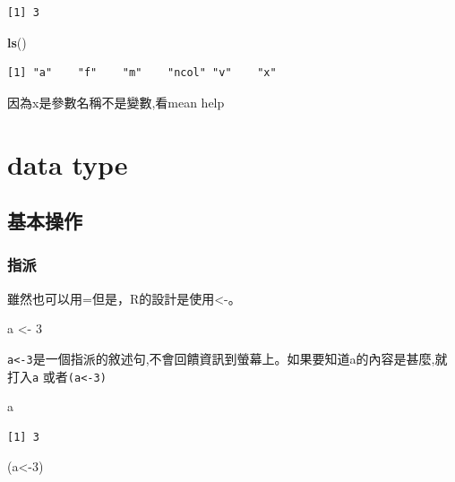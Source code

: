 \documentclass[]{book}
\newenvironment{Shaded}{\begin{snugshade}}{\end{snugshade}}
\newcommand{\DecValTok}[1]{\textcolor[rgb]{0.00,0.00,0.81}{#1}}
\newcommand{\KeywordTok}[1]{\textcolor[rgb]{0.13,0.29,0.53}{\textbf{#1}}}
\newcommand{\NormalTok}[1]{#1}
\newcommand{\StringTok}[1]{\textcolor[rgb]{0.31,0.60,0.02}{#1}}
\theoremstyle{definition}
\theoremstyle{definition}
\theoremstyle{definition}
\theoremstyle{remark}
\begin{document}
\begin{verbatim}
[1] 3
\end{verbatim}

\begin{Shaded}
\begin{Highlighting}[]
\KeywordTok{ls}\NormalTok{()}
\end{Highlighting}
\end{Shaded}

\begin{verbatim}
[1] "a"    "f"    "m"    "ncol" "v"    "x"   
\end{verbatim}

因為x是參數名稱不是變數,看mean help

\hypertarget{data-type}{%
\chapter{data type}\label{data-type}}

\section{基本操作}

\subsection{指派}

雖然也可以用=但是，R的設計是使用\textless{}-。

\begin{Shaded}
\begin{Highlighting}[]
\NormalTok{a <-}\StringTok{ }\DecValTok{3}
\end{Highlighting}
\end{Shaded}

\texttt{a\textless{}-3}是一個指派的敘述句,不會回饋資訊到螢幕上。如果要知道a的內容是甚麼,就打入\texttt{a}
或者\texttt{(a\textless{}-3)}

\begin{Shaded}
\begin{Highlighting}[]
\NormalTok{    a}
\end{Highlighting}
\end{Shaded}

\begin{verbatim}
[1] 3
\end{verbatim}

\begin{Shaded}
\begin{Highlighting}[]
\NormalTok{(a<-}\DecValTok{3}\NormalTok{)}
\end{Highlighting}
\end{Shaded}
\end{document}
